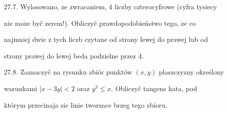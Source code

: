 \documentclass[a4paper,12pt]{article}
\begin{document}
27.7. Wylosowano, ze zwracaniem, 4 liczby czterocyfrowe (cyfra tysiecy

nie $\mathrm{m}\mathrm{o}\dot{\mathrm{z}}\mathrm{e}$ byč zerem!). Obliczyč prawdopodobieństwo tego, $\dot{\mathrm{z}}\mathrm{e}$ co

najmniej dwie $\mathrm{z}$ tych liczb czytane od strony lewej do prawej lub od

strony prawej do lewej beda podzielne przez 4.

27.8. Zaznaczyč na rysunku zbiór punktów $(x,y)$ plaszczyzny określony

warunkami $|x-3y| < 2$ oraz $y^{3} \leq x$. Obliczyč tangens kata, pod

którym przecinaja $\mathrm{s}\mathrm{i}\mathrm{e}$ linie tworzace brzeg tego zbioru.
\end{document}
